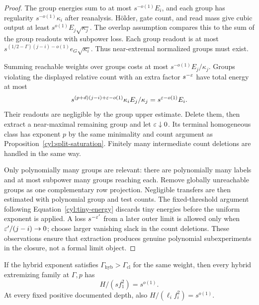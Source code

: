 \begin{proof}
The group energies sum to at most $s^{-o(1)}E_i$, and each group has
regularity $s^{-o(1)}\kappa_i$ after reanalysis.  H\"older, gate count,
and read mass give cubic output at least
$s^{o(1)}E_j\sqrt{\kappa_j}$.  The overlap assumption compares this to
the sum of the group readouts with subpower loss.  Each group readout
is at most
$s^{(1/2-\Gamma)(j-i)-o(1)}e_G\sqrt{\kappa_i}$.
Thus near-extremal normalized groups must exist.

Summing reachable weights over groups costs at most
$s^{-o(1)}E_j/\kappa_j$.  Groups violating the displayed relative count
with an extra factor $s^{-\varepsilon}$ have total energy at most
\[
 s^{(p+d)(j-i)+\varepsilon-o(1)}\kappa_i E_j/\kappa_j
       =s^{\varepsilon-o(1)}E_i.
\]
Their readouts are negligible by the group upper estimate.  Delete them,
then extract a near-maximal remaining group and let $\varepsilon\downarrow0$.
Its terminal homogeneous class has exponent $p$ by the same minimality
and count argument as Proposition~\ref{cyl:split-saturation}.
Finitely many intermediate count deletions are handled in the same way.

Only polynomially many groups are relevant: there are polynomially many
labels and at most subpower many groups reaching each.  Remove globally
unreachable groups as one complementary row projection.  Negligible
transfers are then estimated with polynomial group and test counts.
The fixed-threshold argument following Equation~\eqref{cyl:tiny-energy}
discards tiny energies before the uniform exponent is applied.
A loss $s^{-\varepsilon'}$ from a later outer limit is allowed only
when $\varepsilon'/(j-i)\to0$; choose larger vanishing slack in the count
deletions.  These observations ensure that extraction produces genuine
polynomial subexperiments in the closure, not a formal limit object.
\end{proof}

\begin{proposition}\label{cyl:planck-floor}
If the hybrid exponent satisfies $\Gamma_{\mathrm{hyb}}>\Gamma_{\mathrm{cl}}$
for the same weight, then every hybrid extremizing family at $\Gamma,p$
has
\begin{equation}\tag{Pl}\label{eq:Pl}
 H/(sf_1^2)=s^{o(1)}.
\end{equation}
At every fixed positive documented depth, also
$H/(\ell_i f_i^2)=s^{o(1)}$.
\end{proposition}

